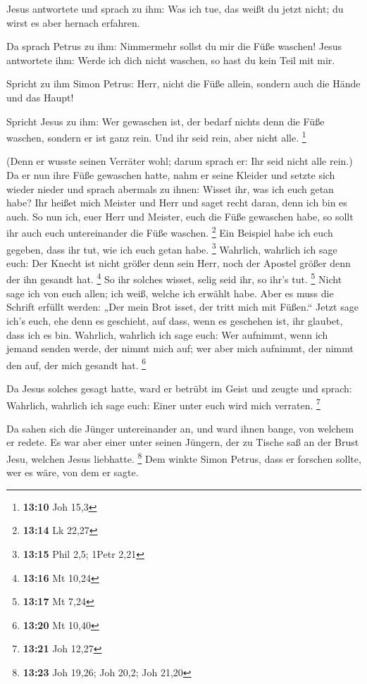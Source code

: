  Jesus antwortete und sprach zu ihm: Was ich tue, das
weißt du jetzt nicht; du wirst es aber hernach erfahren.

 Da sprach Petrus zu ihm: Nimmermehr sollst du mir die
Füße waschen! Jesus antwortete ihm: Werde ich dich nicht waschen, so
hast du kein Teil mit mir.

 Spricht zu ihm Simon Petrus: Herr, nicht die Füße allein,
sondern auch die Hände und das Haupt!

 Spricht Jesus zu ihm: Wer gewaschen ist, der bedarf
nichts denn die Füße waschen, sondern er ist ganz rein. Und ihr seid
rein, aber nicht alle. \footnote{\textbf{13:10} Joh 15,3}

 (Denn er wusste seinen Verräter wohl; darum sprach er:
Ihr seid nicht alle rein.)  Da er nun ihre Füße gewaschen
hatte, nahm er seine Kleider und setzte sich wieder nieder und sprach
abermals zu ihnen: Wisset ihr, was ich euch getan habe? 
Ihr heißet mich Meister und Herr und saget recht daran, denn ich bin es
auch.  So nun ich, euer Herr und Meister, euch die Füße
gewaschen habe, so sollt ihr auch euch untereinander die Füße waschen.
\footnote{\textbf{13:14} Lk 22,27}  Ein Beispiel habe ich
euch gegeben, dass ihr tut, wie ich euch getan habe. \footnote{\textbf{13:15}
  Phil 2,5; 1Petr 2,21}  Wahrlich, wahrlich ich sage
euch: Der Knecht ist nicht größer denn sein Herr, noch der Apostel
größer denn der ihn gesandt hat. \footnote{\textbf{13:16} Mt 10,24}
 So ihr solches wisset, selig seid ihr, so ihr's tut.
\footnote{\textbf{13:17} Mt 7,24}  Nicht sage ich von
euch allen; ich weiß, welche ich erwählt habe. Aber es muss die Schrift
erfüllt werden: „Der mein Brot isset, der tritt mich mit Füßen.``
 Jetzt sage ich's euch, ehe denn es geschieht, auf dass,
wenn es geschehen ist, ihr glaubet, dass ich es bin. 
Wahrlich, wahrlich ich sage euch: Wer aufnimmt, wenn ich jemand senden
werde, der nimmt mich auf; wer aber mich aufnimmt, der nimmt den auf,
der mich gesandt hat. \footnote{\textbf{13:20} Mt 10,40}

 Da Jesus solches gesagt hatte, ward er betrübt im Geist
und zeugte und sprach: Wahrlich, wahrlich ich sage euch: Einer unter
euch wird mich verraten. \footnote{\textbf{13:21} Joh 12,27}

 Da sahen sich die Jünger untereinander an, und ward
ihnen bange, von welchem er redete.  Es war aber einer
unter seinen Jüngern, der zu Tische saß an der Brust Jesu, welchen Jesus
liebhatte. \footnote{\textbf{13:23} Joh 19,26; Joh 20,2; Joh 21,20}
 Dem winkte Simon Petrus, dass er forschen sollte, wer es
wäre, von dem er sagte.

